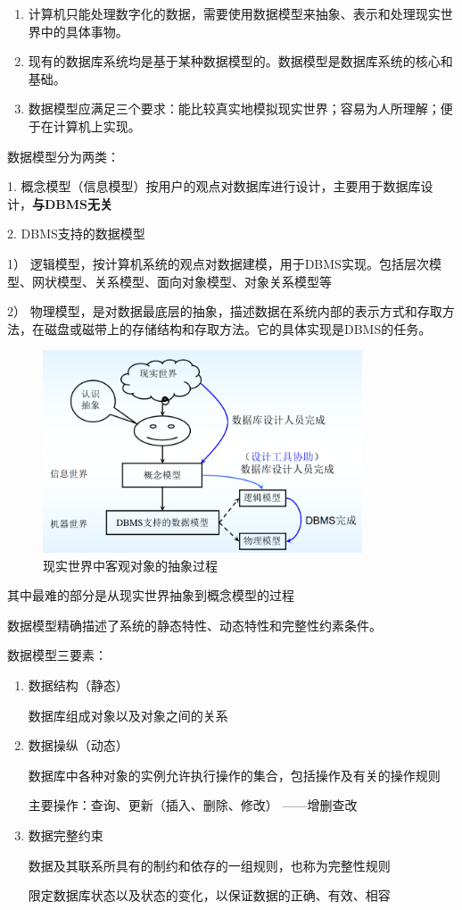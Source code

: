 \documentclass{article}
\begin{document}
\begin{enumerate}
    \item 计算机只能处理数字化的数据，需要使用数据模型来抽象、表示和处理现实世界中的具体事物。
    \item 现有的数据库系统均是基于某种数据模型的。数据模型是数据库系统的核心和基础。
    \item 数据模型应满足三个要求：能比较真实地模拟现实世界；容易为人所理解；便于在计算机上实现。
\end{enumerate}

数据模型分为两类：

1. 概念模型（信息模型）按用户的观点对数据库进行设计，主要用于数据库设计，\textbf{与DBMS无关}

2. DBMS支持的数据模型

    1） 逻辑模型，按计算机系统的观点对数据建模，用于DBMS实现。包括层次模型、网状模型、关系模型、面向对象模型、对象关系模型等

    2） 物理模型，是对数据最底层的抽象，描述数据在系统内部的表示方式和存取方法，在磁盘或磁带上的存储结构和存取方法。它的具体实现是DBMS的任务。

\begin{figure}[H]
    
    \centering
    \includegraphics*[height = 6cm]{img/1.2-1.png}
    \caption{现实世界中客观对象的抽象过程}
\end{figure}

其中最难的部分是从现实世界抽象到概念模型的过程

数据模型精确描述了系统的静态特性、动态特性和完整性约素条件。

数据模型三要素：

\begin{enumerate}
    \item 数据结构（静态）
    
    数据库组成对象以及对象之间的关系

    \item 数据操纵（动态）
    
    数据库中各种对象的实例允许执行操作的集合，包括操作及有关的操作规则

    主要操作：查询、更新（插入、删除、修改） ——增删查改

    \item 数据完整约束
    
    数据及其联系所具有的制约和依存的一组规则，也称为完整性规则

    限定数据库状态以及状态的变化，以保证数据的正确、有效、相容
 \end{enumerate}   
\end{document}
